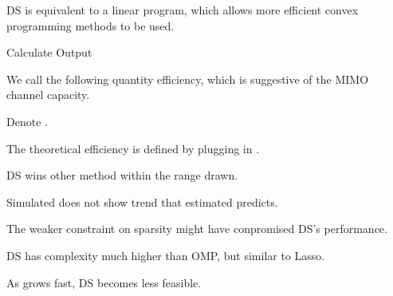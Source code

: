 {
\I DS is equivalent to a linear program, which allows more efficient convex programming methods to be used.

\I Calculate
\I Output 
}
{
\I We call the following quantity \m {\chi} efficiency, which is suggestive of the MIMO channel capacity.

\I Denote .

\I The theoretical efficiency  is defined by plugging in .
}
{
\blank [big]
}
{
\blank [big]
}
{
\blank [big]
}
{
\blank [big]
}
{
\blank [big]
}
{
\I DS wins other method within the range drawn.

\I Simulated \m {\chi} does not show trend that estimated \m {\T {\chi}} predicts.

\I The weaker constraint on sparsity might have conpromised DS's performance.

\I DS has complexity much higher than OMP, but similar to Lasso.

\I As  grows fast, DS becomes less feasible.
}
